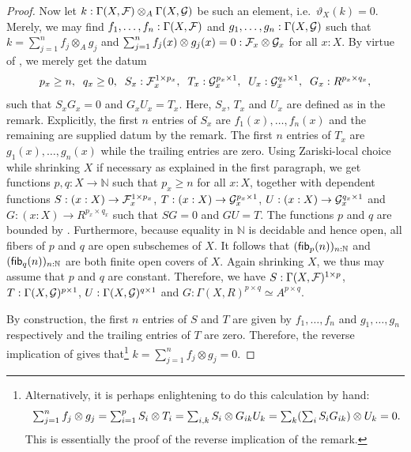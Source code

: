 \begin{proof}
  Now let $k:\Gamma(X,\mathcal{F}) \otimes_A \Gamma(X,\mathcal{G})$ be such an element, i.e.\ $\vartheta_X(k)=0$.
  Merely, we may find $f_1,\hdots,f_n : \Gamma(X,\mathcal{F})$ and $g_1,\hdots,g_n : \Gamma(X,\mathcal{G})$ such that $k = \sum_{j=1}^n f_j \otimes_A g_j$ and $\sum_{j=1}^n f_j(x) \otimes g_j(x) = 0  : \mathcal{F}_x \otimes \mathcal{G}_x$ for all $x:X$.
  By virtue of , we merely get the datum
  \[
    p_x \geq n, \;\;
    q_x \geq 0, \;\;
    S_x : \mathcal{F}_x^{1 \times p_x}, \;\;
    T_x : \mathcal{G}_x^{p_x \times 1}, \;\;
    U_x : \mathcal{G}_x^{q_x \times 1}, \;\;
    G_x : R^{p_x \times q_x},
  \]
  such that $S_xG_x = 0$ and $G_xU_x = T_x$. Here, $S_x$, $T_x$ and $U_x$ are defined as in the remark.
  Explicitly, the first $n$ entries of $S_x$ are $f_1(x), \hdots, f_n(x)$  and the remaining are supplied datum by the remark.
  The first $n$ entries of $T_x$ are $g_1(x), \hdots, g_n(x)$ while the trailing entries are zero.
  Using Zariski-local choice while shrinking $X$ if necessary as explained in the first paragraph, we get functions $p,q : X \to \mathbb N$ such that $p_x \geq n$ for all $x:X$, together with dependent functions $S : (x:X) \to \mathcal{F}_x^{1 \times p_x}$, $T : (x:X) \to \mathcal{G}_x^{p_x \times 1}$, $U : (x:X) \to \mathcal{G}_x^{q_x \times 1}$ and $G : (x:X) \to R^{p_x \times q_x}$ such that $SG = 0$ and $GU = T$.
  The functions $p$ and $q$ are bounded by \cite[Theorem 3.3.3]{draft}.
  Furthermore, because equality in $\mathbb N$ is decidable and hence open, all fibers of $p$ and $q$ are open subschemes of $X$.
  It follows that $(\mathsf{fib}_p(n))_{n:\mathbb N}$ and $(\mathsf{fib}_q(n))_{n:\mathbb N}$ are both finite open covers of $X$.
  Again shrinking $X$, we thus may assume that $p$ and $q$ are constant.
  Therefore, we have $S : \Gamma(X,\mathcal{F})^{1 \times p}$, $T : \Gamma(X,\mathcal{G})^{p \times 1}$, $U : \Gamma(X,\mathcal{G})^{q \times 1}$ and $G : \Gamma(X, R)^{p \times q} \simeq A^{p \times q}$.

  By construction, the first $n$ entries of $S$ and $T$ are given by $f_1, \hdots, f_n$ and $g_1, \hdots, g_n$ respectively and the trailing entries of $T$ are zero.
  Therefore, the reverse implication of  gives that\footnote{
    Alternatively, it is perhaps enlightening to do this calculation by hand:
    \[
      \textstyle
      \sum_{j=1}^n f_j \otimes g_j = \sum_{i=1}^p S_i \otimes T_i = \sum_{i,k} S_i \otimes G_{ik}U_k = \sum_k(\sum_i S_iG_{ik}) \otimes U_k = 0 \rlap{.}
    \]
    This is essentially the proof of the reverse implication of the remark.
  }
  $k = \sum_{j=1}^n f_j \otimes g_j = 0$.


\end{proof}
